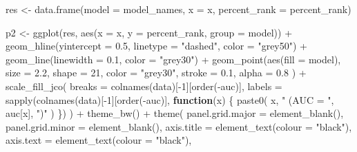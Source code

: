 \documentclass[
  11pt,
  oneside]{book}
\newenvironment{Shaded}{\begin{snugshade}}{\end{snugshade}}
\newcommand{\AttributeTok}[1]{\textcolor[rgb]{0.77,0.63,0.00}{#1}}
\newcommand{\ControlFlowTok}[1]{\textcolor[rgb]{0.13,0.29,0.53}{\textbf{#1}}}
\newcommand{\DecValTok}[1]{\textcolor[rgb]{0.00,0.00,0.81}{#1}}
\newcommand{\FloatTok}[1]{\textcolor[rgb]{0.00,0.00,0.81}{#1}}
\newcommand{\FunctionTok}[1]{\textcolor[rgb]{0.00,0.00,0.00}{#1}}
\newcommand{\NormalTok}[1]{#1}
\newcommand{\OtherTok}[1]{\textcolor[rgb]{0.56,0.35,0.01}{#1}}
\newcommand{\SpecialCharTok}[1]{\textcolor[rgb]{0.00,0.00,0.00}{#1}}
\newcommand{\StringTok}[1]{\textcolor[rgb]{0.31,0.60,0.02}{#1}}
\begin{document}
\begin{Shaded}
\begin{Highlighting}[]
\NormalTok{res }\OtherTok{\textless{}{-}} \FunctionTok{data.frame}\NormalTok{(}\AttributeTok{model =}\NormalTok{ model\_names, }\AttributeTok{x =}\NormalTok{ x, }\AttributeTok{percent\_rank =}\NormalTok{ percent\_rank)}

\NormalTok{p2 }\OtherTok{\textless{}{-}} \FunctionTok{ggplot}\NormalTok{(res, }\FunctionTok{aes}\NormalTok{(}\AttributeTok{x =}\NormalTok{ x, }\AttributeTok{y =} \StringTok{\textasciigrave{}}\AttributeTok{percent\_rank}\StringTok{\textasciigrave{}}\NormalTok{, }\AttributeTok{group =}\NormalTok{ model)) }\SpecialCharTok{+}
  \FunctionTok{geom\_hline}\NormalTok{(}\AttributeTok{yintercept =} \FloatTok{0.5}\NormalTok{, }\AttributeTok{linetype =} \StringTok{"dashed"}\NormalTok{, }\AttributeTok{color =} \StringTok{"grey50"}\NormalTok{) }\SpecialCharTok{+}
  \FunctionTok{geom\_line}\NormalTok{(}\AttributeTok{linewidth =} \FloatTok{0.1}\NormalTok{, }\AttributeTok{color =} \StringTok{"grey30"}\NormalTok{) }\SpecialCharTok{+}
  \FunctionTok{geom\_point}\NormalTok{(}\FunctionTok{aes}\NormalTok{(}\AttributeTok{fill =}\NormalTok{ model),}
    \AttributeTok{size =} \FloatTok{2.2}\NormalTok{, }\AttributeTok{shape =} \DecValTok{21}\NormalTok{, }\AttributeTok{color =} \StringTok{"grey30"}\NormalTok{, }\AttributeTok{stroke =} \FloatTok{0.1}\NormalTok{,}
    \AttributeTok{alpha =} \FloatTok{0.8}
\NormalTok{  ) }\SpecialCharTok{+}
  \FunctionTok{scale\_fill\_jco}\NormalTok{(}
    \AttributeTok{breaks =} \FunctionTok{colnames}\NormalTok{(data)[}\SpecialCharTok{{-}}\DecValTok{1}\NormalTok{][}\FunctionTok{order}\NormalTok{(}\SpecialCharTok{{-}}\NormalTok{auc)],}
    \AttributeTok{labels =} \FunctionTok{sapply}\NormalTok{(}\FunctionTok{colnames}\NormalTok{(data)[}\SpecialCharTok{{-}}\DecValTok{1}\NormalTok{][}\FunctionTok{order}\NormalTok{(}\SpecialCharTok{{-}}\NormalTok{auc)], }\ControlFlowTok{function}\NormalTok{(x) \{}
      \FunctionTok{paste0}\NormalTok{(}
\NormalTok{        x, }\StringTok{" (AUC = "}\NormalTok{,}
\NormalTok{        auc[x], }\StringTok{")"}
\NormalTok{      )}
\NormalTok{    \})}
\NormalTok{  ) }\SpecialCharTok{+}
  \FunctionTok{theme\_bw}\NormalTok{() }\SpecialCharTok{+}
  \FunctionTok{theme}\NormalTok{(}
    \AttributeTok{panel.grid.major =} \FunctionTok{element\_blank}\NormalTok{(),}
    \AttributeTok{panel.grid.minor =} \FunctionTok{element\_blank}\NormalTok{(),}
    \AttributeTok{axis.title =} \FunctionTok{element\_text}\NormalTok{(}\AttributeTok{colour =} \StringTok{"black"}\NormalTok{),}
    \AttributeTok{axis.text =} \FunctionTok{element\_text}\NormalTok{(}\AttributeTok{colour =} \StringTok{"black"}\NormalTok{),}

\end{Highlighting}
\end{Shaded}
\end{document}
